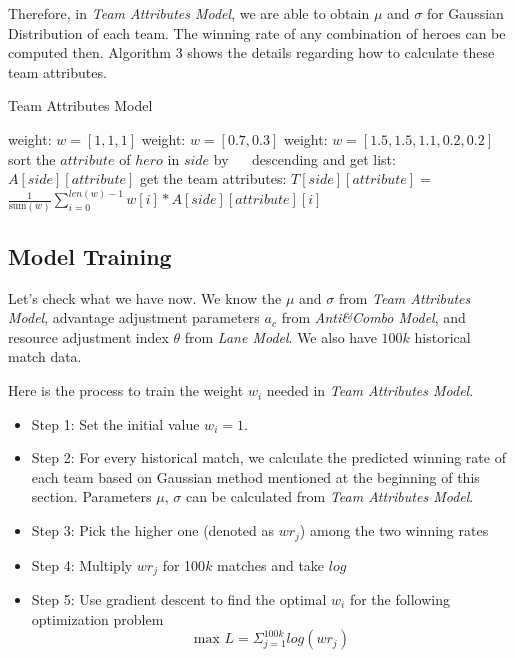 \documentclass[letterpaper, 10 pt, conference]{ieeeconf}  %
\begin{document}
Therefore, in \textit{Team Attributes Model}, we are able to obtain $\mu$ and $\sigma$ for Gaussian Distribution of each team. The winning rate of any combination of heroes can be computed then. Algorithm 3 shows the details regarding how to calculate these team attributes. 

\begin{algorithm}
\caption{Team Attributes Model}
\begin{algorithmic}
        
                \State weight: $w = [1, 1, 1]$
                \State weight: $w = [0.7, 0.3]$
            \Else
                \State weight: $w = [1.5, 1.5, 1.1, 0.2, 0.2]$
            \EndIf
            \State sort the $attribute$ of $hero$ in $side$ by 
            \State $\quad$ descending and get list: $A[side][attribute]$
            \State get the team attributes: $T[side][attribute] =$
            \State $\frac{1}{\text{sum}(w)} \sum_{i=0}^{len(w)-1}w[i]*A[side][attribute][i]$
        \EndFor
    \EndFor   
\EndFunction
\end{algorithmic}
\end{algorithm}

\subsection{Model Training}

Let's check what we have now. We know the $\mu$ and $\sigma$ from \textit{Team Attributes Model}, advantage adjustment parameters $a_c$ from \textit{Anti\&Combo Model}, and resource adjustment index $\theta$ from \textit{Lane Model}. We also have $100k$ historical match data. 

Here is the process to train the weight $w_i$ needed in \textit{Team Attributes Model}.
\begin{itemize}
\item Step 1: Set the initial value $w_i = 1$.
\item Step 2: For every historical match, we calculate the predicted winning rate of each team based on Gaussian method mentioned at the beginning of this section. Parameters $\mu$, $\sigma$ can be calculated from \textit{Team Attributes Model}.
\item Step 3: Pick the higher one (denoted as $wr_j$) among the two winning rates
\item Step 4: Multiply $wr_j$ for 100$k$ matches and take $log$
\item Step 5: Use gradient descent to find the optimal $w_i$ for the following optimization problem 
$$\text{max } L = \Sigma_{j = 1}^{100k}log(wr_j)$$

\end{itemize}
\end{document}
